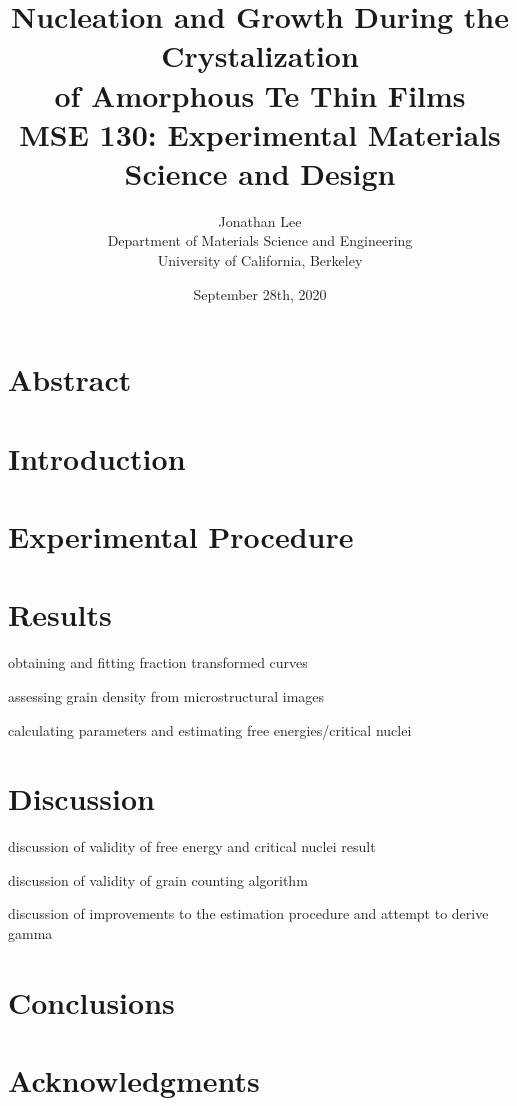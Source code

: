 \documentclass[12pt, titlepage]{article}
\title{\Large Nucleation and Growth During the Crystalization \\
		of Amorphous Te Thin Films \\
		\bigskip
	\normalsize MSE 130: Experimental Materials Science and Design}
\author{\normalsize Jonathan Lee \\
	\normalsize Department of Materials Science and Engineering \\
	\normalsize University of California, Berkeley}
\date{\normalsize September 28th, 2020}
\begin{document}
\maketitle

\doublespacing

\setcounter{page}{2}

\tableofcontents

\newpage

\section{Abstract}

\section{Introduction}



\section{Experimental Procedure}



\section{Results}

obtaining and fitting fraction transformed curves

assessing grain density from microstructural images

calculating parameters and estimating free energies/critical nuclei



\section{Discussion}

discussion of validity of free energy and critical nuclei result

discussion of validity of grain counting algorithm

discussion of improvements to the estimation procedure and attempt to derive gamma



\section{Conclusions}

\section{Acknowledgments}

\printbibliography[heading=bibnumbered]
\end{document}
